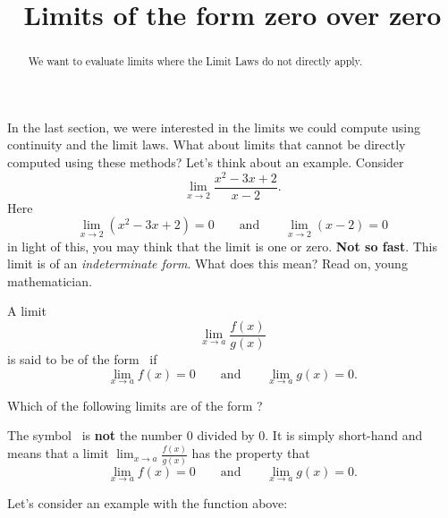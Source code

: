 \documentclass{ximera}
\title[Dig-In:]{Limits of the form zero over zero}
\begin{document}
\begin{abstract}
  We want to evaluate limits where the Limit Laws do not directly apply. 
\end{abstract}

\maketitle

In the last section, we were interested in the limits we could compute
using continuity and the limit laws. What about limits that cannot be
directly computed using these methods? Let's think about an example. Consider
\[
\lim_{x\to 2}\frac{x^2-3x+2}{x-2}.
\]
Here 
\[
\lim_{x\to 2}\left(x^2-3x+2\right) = 0\qquad\text{and}\qquad \lim_{x\to
  2}\left(x-2\right) = 0
\]
in light of this, you may think that the limit is one or
zero. \textbf{Not so fast}. This limit is of an \textit{indeterminate
  form}. What does this mean? Read on, young mathematician.

\begin{definition}
  A limit
  \[
  \lim_{x\to a} \frac{f(x)}{g(x)}
  \]
  is said to be of the form \zeroOverZero\ if
  \[
  \lim_{x\to a} f(x) = 0\qquad\text{and}\qquad \lim_{x\to a} g(x) =0.
  \]
\end{definition}

\begin{question}
  Which of the following limits are of the form \zeroOverZero?
  \begin{selectAll}
  \end{selectAll}
\end{question}

\begin{warning}
  The symbol \zeroOverZero\ is \textbf{not} the number $0$ divided by
  $0$. It is simply short-hand and means that a limit $\lim_{x\to a}
  \frac{f(x)}{g(x)}$ has the property that
  \[
  \lim_{x\to a} f(x) = 0\qquad\text{and}\qquad \lim_{x\to a} g(x) =0.
  \]
\end{warning}


Let's consider an example with the function above:
\end{document}
